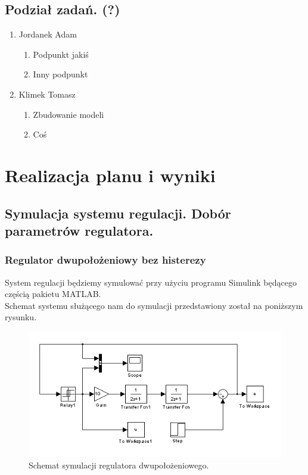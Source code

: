 \documentclass[a4paper,10pt]{article}
\begin{document}
\subsection{Podział zadań. (?)} 
\begin{enumerate}
		\item Jordanek Adam
		\begin{enumerate}
			\item Podpunkt jakiś
			\item Inny podpunkt
 		\end{enumerate}
		\item Klimek Tomasz
		\begin{enumerate}
			\item Zbudowanie modeli
			\item Coś
 		\end{enumerate}
\end{enumerate}

\newpage
\section{Realizacja planu i wyniki}
\subsection{Symulacja systemu regulacji. Dobór parametrów regulatora.}\label{sec:zad1}

\subsubsection{Regulator dwupołożeniowy bez histerezy}\label{sec:r2bh}%
System regulacji będziemy symulować przy użyciu programu Simulink będącego częścią pakietu M\small ATLAB. \\
\normalsize Schemat systemu służącego nam do symulacji przedstawiony został na poniższym rysunku.

\begin{figure}[!h]
    \centering
	\includegraphics[width=120mm]{CW3-schemat-2.png}
	\caption{Schemat symulacji regulatora dwupołożeniowego.}
    \label{fig:Rysunek}
\end{figure}
\end{document}
